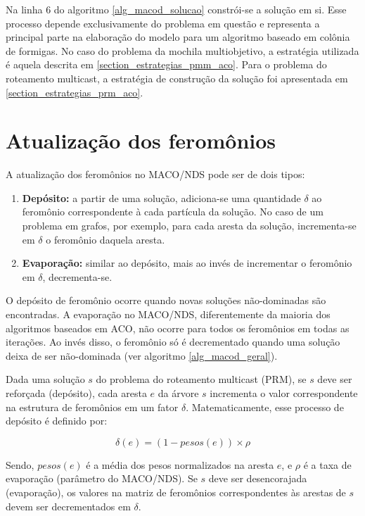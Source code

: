 Na linha 6 do algoritmo \ref{alg_macod_solucao} constrói-se a solução em si. Esse processo depende exclusivamente do problema em questão e representa a principal parte na elaboração do modelo para um algoritmo baseado em colônia de formigas. No caso do problema da mochila multiobjetivo, a estratégia utilizada é aquela descrita em \ref{section_estrategias_pmm_aco}. Para o problema do roteamento multicast, a estratégia de construção da solução foi apresentada em \ref{section_estrategias_prm_aco}.

\section{Atualização dos feromônios}
\label{section_macod_pheromones}

A atualização dos feromônios no MACO/NDS pode ser de dois tipos:

\begin{enumerate}
	\item \textbf{Depósito:} a partir de uma solução, adiciona-se uma quantidade $\delta$ ao feromônio correspondente à cada partícula da solução. No caso de um problema em grafos, por exemplo, para cada aresta da solução, incrementa-se em $\delta$ o feromônio daquela aresta.
	\item \textbf{Evaporação:} similar ao depósito, mais ao invés de incrementar o feromônio em $\delta$, decrementa-se.
\end{enumerate}

O depósito de feromônio ocorre quando novas soluções não-dominadas são encontradas. A evaporação no MACO/NDS, diferentemente da maioria dos algoritmos baseados em ACO, não ocorre para todos os feromônios em todas as iterações. Ao invés disso, o feromônio só é decrementado quando uma solução deixa de ser não-dominada (ver algoritmo \ref{alg_macod_geral}).

Dada uma solução $s$ do problema do roteamento multicast (PRM), se $s$ deve ser reforçada (depósito), cada aresta $e$ da árvore $s$ incrementa o valor correspondente na estrutura de feromônios em um fator $\delta$. Matematicamente, esse processo de depósito é definido por:

\[\delta(e) = (1 - pesos(e)) \times \rho\]

Sendo, $pesos(e)$ é a média dos pesos normalizados na aresta $e$, e $\rho$ é a taxa de evaporação (parâmetro do MACO/NDS). Se $s$ deve ser desencorajada (evaporação), os valores na matriz de feromônios correspondentes às arestas de $s$ devem ser decrementados em $\delta$.

